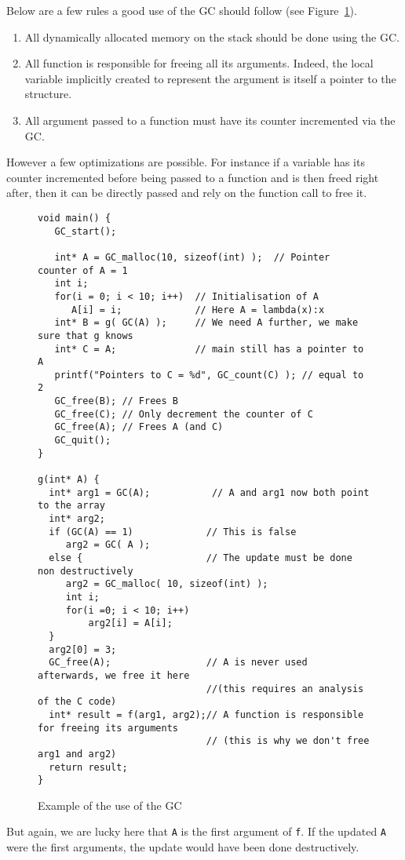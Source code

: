 \documentclass[12pt,a4paper]{article}
\newcommand{\cl}[1]{\texttt{#1}}
\begin{document}
Below are a few rules a good use of the GC should follow (see Figure~\ref{fig:exampleGC}).
\begin{enumerate}
\item All dynamically allocated memory on the stack should be done using the GC.
\item All function is responsible for freeing all its arguments. Indeed, the local variable implicitly created to represent the argument is itself a pointer to the structure.
\item All argument passed to a function must have its counter incremented via the GC.
\end{enumerate}
However a few optimizations are possible. For instance if a variable has its counter incremented before being passed to a function and is then freed right after, then it can be directly passed and rely on the function call to free it.
\begin{figure}[!ht]
\begin{lstlisting}
void main() {
   GC_start();
   
   int* A = GC_malloc(10, sizeof(int) );  // Pointer counter of A = 1
   int i;
   for(i = 0; i < 10; i++)  // Initialisation of A
      A[i] = i;             // Here A = lambda(x):x
   int* B = g( GC(A) );     // We need A further, we make sure that g knows
   int* C = A;              // main still has a pointer to A
   printf("Pointers to C = %d", GC_count(C) ); // equal to 2
   GC_free(B); // Frees B
   GC_free(C); // Only decrement the counter of C
   GC_free(A); // Frees A (and C)
   GC_quit();
}

g(int* A) {
  int* arg1 = GC(A);           // A and arg1 now both point to the array
  int* arg2;
  if (GC(A) == 1)             // This is false
     arg2 = GC( A );
  else {                      // The update must be done non destructively
     arg2 = GC_malloc( 10, sizeof(int) );
     int i;
     for(i =0; i < 10; i++)
         arg2[i] = A[i];
  }  
  arg2[0] = 3;
  GC_free(A);                 // A is never used afterwards, we free it here
                              //(this requires an analysis of the C code)
  int* result = f(arg1, arg2);// A function is responsible for freeing its arguments
                              // (this is why we don't free arg1 and arg2)
  return result;
}
\end{lstlisting}
\caption{Example of the use of the GC}
\label{fig:exampleGC}
\end{figure}

But again, we are lucky here that \cl{A} is the first argument of \cl{f}. If the updated \cl{A} were the first arguments, the update would have been done destructively.\\
\end{document}
